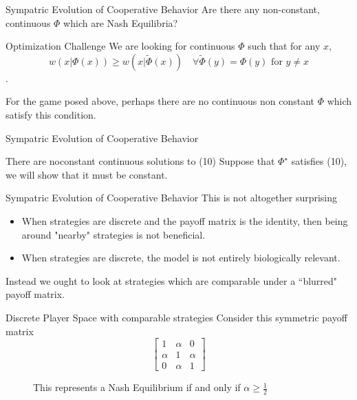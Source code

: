 \documentclass{beamer}
\begin{document}
\begin{frame}{Sympatric Evolution of Cooperative Behavior}
	Are there any non-constant, continuous $\Phi$ which are Nash Equilibria?
	\begin{block}{Optimization Challenge}
		We are looking for continuous $\Phi$ such that for any $x$,
		\begin{equation}
			w(x|\Phi(x))\geq w(x|\tilde\Phi(x))\quad \forall \tilde \Phi(y) = \Phi (y) \text{ for } y\neq x
		\end{equation}. 
	\end{block}

	For the game posed above, perhaps there are no continuous non constant $\Phi$ which satisfy this condition. 
\end{frame}

\begin{frame}{Sympatric Evolution of Cooperative Behavior}
	\begin{block}{There are noconstant continuous solutions to (10)}
		Suppose that $\Phi^\star$ satisfies (10), we will show that it must be constant. 
	\end{block}
\end{frame}
	
\begin{frame}{Sympatric Evolution of Cooperative Behavior}
	This is not altogether surprising
	\begin{itemize}
		\item When strategies are discrete and the payoff matrix is the identity, then being around "nearby" strategies is not beneficial. 
		\item When strategies are discrete, the model is not entirely biologically relevant. 
	\end{itemize}
	Instead we ought to look at strategies which are comparable under a ``blurred" payoff matrix. 
\end{frame}

\begin{frame}{Discrete Player Space with comparable strategies}
	Consider this symmetric payoff matrix
	\begin{equation}
		\begin{bmatrix}
			1&\alpha&0\\
			\alpha&1&\alpha\\
			0&\alpha&1
		\end{bmatrix}
	\end{equation}
	\begin{figure} 
	\caption{This represents a Nash Equilibrium if and only if $\alpha\geq \frac{1}{2}$}
\end{figure}	
\end{frame}
	
\end{document}
